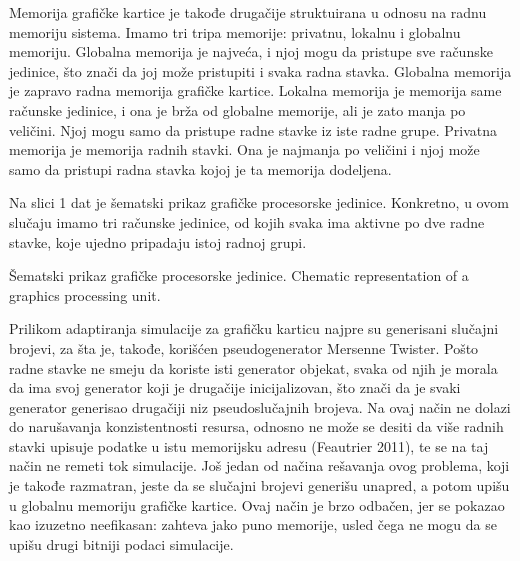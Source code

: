Memorija grafičke kartice je takođe drugačije struktuirana u odnosu na radnu memoriju sistema. Imamo tri tripa memorije: privatnu, lokalnu i globalnu memoriju. Globalna memorija je najveća, i njoj mogu da pristupe sve računske jedinice, što znači da joj može pristupiti i svaka radna stavka. Globalna memorija je zapravo radna memorija grafičke kartice. Lokalna memorija je memorija same računske jedinice, i ona je brža od globalne memorije, ali je zato manja po veličini. Njoj mogu samo da pristupe radne stavke iz iste radne grupe. Privatna memorija je memorija radnih stavki. Ona je najmanja po veličini i njoj može samo da pristupi radna stavka kojoj je ta memorija dodeljena.

Na slici 1 dat je šematski prikaz grafičke procesorske jedinice. Konkretno, u ovom slučaju imamo tri računske jedinice, od kojih svaka ima aktivne po dve radne stavke, koje ujedno pripadaju istoj radnoj grupi.

    {Šematski prikaz grafičke procesorske jedinice.}
    {Chematic representation of a graphics processing unit.}

Prilikom adaptiranja simulacije za grafičku karticu najpre su generisani slučajni brojevi, za šta je, takođe, korišćen pseudogenerator Mersenne Twister. Pošto radne stavke ne smeju da koriste isti generator objekat, svaka od njih je morala da ima svoj generator koji je drugačije inicijalizovan, što znači da je svaki generator generisao drugačiji niz pseudoslučajnih brojeva. Na ovaj način ne dolazi do narušavanja konzistentnosti resursa, odnosno ne može se desiti da više radnih stavki upisuje podatke u istu memorijsku adresu (Feautrier 2011), te se na taj način ne remeti tok simulacije. Još jedan od načina rešavanja ovog problema, koji je takođe razmatran, jeste da se slučajni brojevi generišu unapred, a potom upišu u globalnu memoriju grafičke kartice. Ovaj način je brzo odbačen, jer se pokazao kao izuzetno neefikasan: zahteva jako puno memorije, usled čega ne mogu da se upišu drugi bitniji podaci simulacije.

